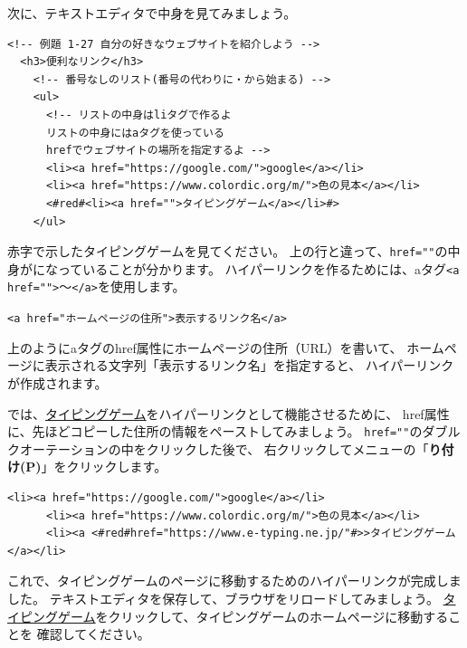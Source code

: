 \documentclass[text01.tex]{subfiles}
\begin{document}
次に、テキストエディタで中身を見てみましょう。
\bigskip

\begin{lstlisting}[caption=ハイパーリンク（編集前）,label=pwdtest,firstnumber=1]
  <!-- 例題 1-27 自分の好きなウェブサイトを紹介しよう -->
  <h3>便利なリンク</h3>
    <!-- 番号なしのリスト(番号の代わりに・から始まる) -->
    <ul>
      <!-- リストの中身はliタグで作るよ
      リストの中身にはaタグを使っている 
      hrefでウェブサイトの場所を指定するよ -->
      <li><a href="https://google.com/">google</a></li>
      <li><a href="https://www.colordic.org/m/">色の見本</a></li>
      <#red#<li><a href="">タイピングゲーム</a></li>#>
    </ul>
\end{lstlisting} 

\noindent%
赤字で示したタイピングゲームを見てください。
上の行と違って、\texttt{href=""}の中身がになっていることが分かります。
ハイパーリンクを作るためには、aタグ\texttt{<a href="">}～\texttt{</a>}を使用します。
\vspace{.5cm}

\texttt{<a href="ホームページの住所">表示するリンク名</a>}
\vspace{.5cm}

\noindent%
上のようにaタグのhref属性にホームページの住所（URL）を書いて、
ホームページに表示される文字列「表示するリンク名」を指定すると、
ハイパーリンクが作成されます。

では、\ul{タイピングゲーム}をハイパーリンクとして機能させるために、
href属性に、先ほどコピーした住所の情報をペーストしてみましょう。
\texttt{href=""}のダブルクオーテーションの中をクリックした後で、
右クリックしてメニューの「\textbf{り付け(P)}」をクリックします。
\vspace{0.5cm}

\begin{lstlisting}[caption=ハイパーリンク（編集後）,label=pwdtest,firstnumber=1]
      <li><a href="https://google.com/">google</a></li>
      <li><a href="https://www.colordic.org/m/">色の見本</a></li>
      <li><a <#red#href="https://www.e-typing.ne.jp/"#>>タイピングゲーム</a></li>
\end{lstlisting} 

\noindent%
これで、タイピングゲームのページに移動するためのハイパーリンクが完成しました。
テキストエディタを保存して、ブラウザをリロードしてみましょう。
\ul{タイピングゲーム}をクリックして、タイピングゲームのホームページに移動することを
確認してください。
\end{document}
